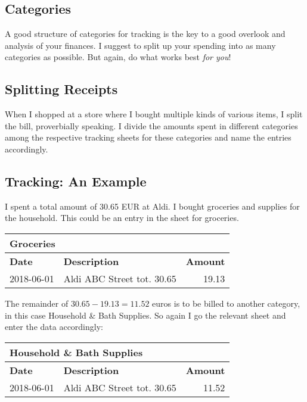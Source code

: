 \subsection{Categories}
\label{subsec:tracking-categories}

A good structure of categories for tracking is the key to a good overlook and analysis of your finances.
I suggest to split up your spending into as many categories as possible.
But again, do what works best \emph{for you}!

\subsection{Splitting Receipts}
\label{subsec:splitting-receipts}

When I shopped at a store where I bought multiple kinds of various items, I split the bill, proverbially speaking.
I divide the amounts spent in different categories among the respective tracking sheets for these categories and name the entries accordingly.

\subsection{Tracking: An Example}
\label{subsec:tracking-example}

I spent a total amount of 30.65 EUR at Aldi.
I bought groceries and supplies for the household.
This could be an entry in the sheet for groceries.
\begin{center}\sffamily
	\begin{tabular}{|l|l|r|}
		\multicolumn{3}{l}{Groceries}\\
		\hline
		\textbf{Date} & \textbf{Description} & \textbf{Amount}\rmfamily\\
		\hline
		2018-06-01 & Aldi ABC Street tot. 30.65 & 19.13\\
		\hline
	\end{tabular}
\end{center}
The remainder of \( 30.65 - 19.13 = 11.52 \) euros is to be billed to another category, in this case Household \& Bath Supplies.
So again I go the relevant sheet and enter the data accordingly:
\begin{center}\sffamily
	\begin{tabular}{|l|l|r|}
		\multicolumn{3}{l}{Household \& Bath Supplies}\\			
		\hline
		\textbf{Date} & \textbf{Description} & \textbf{Amount}\\
		\hline
		2018-06-01 & Aldi ABC Street tot. 30.65 & 11.52\\
		\hline
	\end{tabular}
\end{center}

